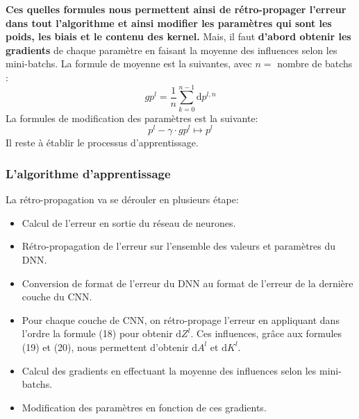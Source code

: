 \documentclass[12pt,a4paper]{extarticle}
\newcommand{\ud}{\mathrm{d}}
\begin{document}
\textbf{Ces quelles formules nous permettent ainsi de rétro-propager l'erreur dans tout l'algorithme et ainsi modifier les paramètres qui sont les poids, les biais et le contenu des kernel.} Mais, il faut \textbf{d'abord obtenir les gradients} de chaque paramètre en faisant la moyenne des influences selon les mini-batchs. La formule de moyenne est la suivantes, avec $n =$ nombre de batchs :
\begin{equation}
gp^l = \frac{1}{n}\sum_{k=0}^{n-1}\ud p^{l,n}
\end{equation}
La formules de modification des paramètres est la suivante:
\begin{equation}
p^l - \gamma \cdot gp^l \mapsto p^l
\end{equation}
Il reste à établir le processus d'apprentissage.

\subsubsection{L'algorithme d'apprentissage}

La rétro-propagation va se dérouler en plusieurs étape:
\begin{itemize}
\item Calcul de l'erreur en sortie du réseau de neurones.
\item Rétro-propagation de l'erreur sur l'ensemble des valeurs et paramètres du DNN.
\item Conversion de format de l'erreur du DNN au format de l'erreur de la dernière couche du CNN.
\item Pour chaque couche de CNN, on rétro-propage l'erreur en appliquant dans l'ordre la formule (18) pour obtenir $\ud Z^l$. Ces influences, grâce aux formules (19) et (20), nous permettent d'obtenir $\ud A^l$ et $\ud K^l$.
\item Calcul des gradients en effectuant la moyenne des influences selon les mini-batchs.
\item Modification des paramètres en fonction de ces gradients. 
\end{itemize}
\end{document}
